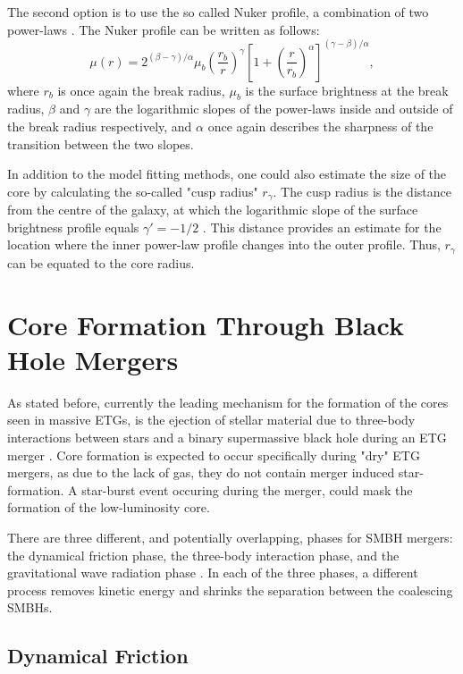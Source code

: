 \documentclass[english, twoside]{HYgradu}
\begin{document}
The second option is to use the so called Nuker profile, a combination of two power-laws \citep{Lauer1995}. The Nuker profile can be written as follows:
\begin{equation}
\mu(r) = 2^{(\beta - \gamma) / \alpha} \mu_b \left( \frac{r_b}{r} \right)^\gamma \left[ 1 + \left( \frac{r}{r_b} \right)^\alpha \right]^{(\gamma - \beta)/\alpha},
\label{eq:nuker}
\end{equation}
where $r_b$ is once again the break radius, $\mu_b$ is the surface brightness at the break radius, $\beta$ and $\gamma$ are the logarithmic slopes of the power-laws inside and outside of the break radius respectively, and $\alpha$ once again describes the sharpness of the transition between the two slopes.

In addition to the model fitting methods, one could also estimate the size of the core by calculating the so-called "cusp radius" $r_\gamma$. The cusp radius is the distance from the centre of the galaxy, at which the logarithmic slope of the surface brightness profile equals $\gamma' = -1/2$ \citep{Carollo1997, Lauer2007Cusp}. This distance provides an estimate for the location where the inner power-law profile changes into the outer profile. Thus, $r_\gamma$ can be equated to the core radius. 

\section{Core Formation Through Black Hole Mergers}

As stated before, currently the leading mechanism for the formation of the cores seen in massive ETGs, is the ejection of stellar material due to three-body interactions between stars and a binary supermassive black hole during an ETG merger \citep[e.g.][]{Faber1997, Milosavljevic2002, GalaxyFormationAndEvo2010}. Core formation is expected to occur specifically during "dry" ETG mergers, as due to the lack of gas, they do not contain merger induced star-formation. A star-burst event occuring during the merger, could mask the formation of the low-luminosity core.

There are three different, and potentially overlapping, phases for SMBH mergers: the dynamical friction phase, the three-body interaction phase, and the gravitational wave radiation phase \citep{MerrittBook}. In each of the three phases, a different process removes kinetic energy and shrinks the separation between the coalescing SMBHs.

\subsection{Dynamical Friction}
\end{document}
